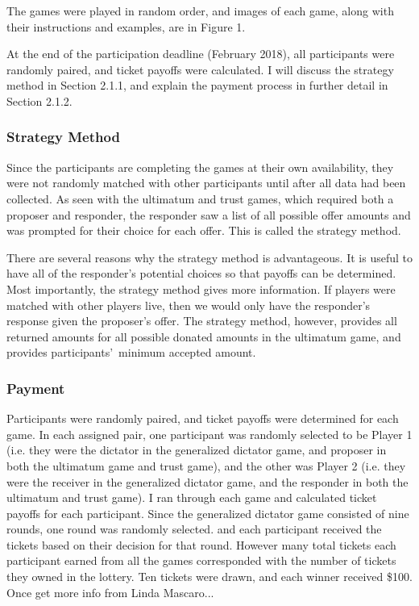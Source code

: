 \documentclass[12pt]{article}
\begin{document}
The games were played in random order, and images of each game, along with their instructions and examples, are in {\color{green}Figure 1}.

 At the end of the participation deadline (February 2018), all participants were randomly paired, and ticket payoffs were calculated. I will discuss the strategy method in Section 2.1.1, and explain the payment process in further detail in Section 2.1.2. 

\subsubsection{Strategy Method}

Since the participants are completing the games at their own availability, they were not randomly matched with other participants until after all data had been collected. As seen with the ultimatum and trust games, which required both a proposer and responder, the responder saw a list of all possible offer amounts and was prompted for their choice for each offer. This is called the strategy method.

There are several reasons why the strategy method is advantageous. It is useful to have all of the responder\rq s potential choices so that payoffs can be determined. Most importantly, the strategy method gives more information. If players were matched with other players live, then we would only have the responder\rq s response given the proposer\rq s offer. The strategy method, however, provides all returned amounts for all possible donated amounts in the ultimatum game, and provides participants\rq \ minimum accepted amount. 

\subsubsection{Payment}

Participants were randomly paired, and ticket payoffs were determined for each game. In each assigned pair, one participant was randomly selected to be Player 1 (i.e. they were the dictator in the generalized dictator game, and proposer in both the ultimatum game and trust game), and the other was Player 2 (i.e. they were the receiver in the generalized dictator game, and the responder in both the ultimatum and trust game). I ran through each game and calculated ticket payoffs for each participant. Since the generalized dictator game consisted of nine rounds, one round was randomly selected. and each participant received the tickets based on their decision for that round. However many total tickets each participant earned from all the games corresponded with the number of tickets they owned in the lottery. Ten tickets were drawn, and each winner received \$100. {\color{red} Once get more info from Linda Mascaro...}
\end{document}
